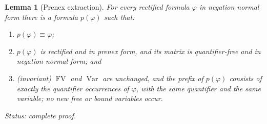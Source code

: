 \documentclass[11pt,oneside,openany]{book}
\theoremstyle{definition}
\theoremstyle{plain}
\newtheorem{lemma}[definition]{Lemma}
\theoremstyle{remark}
\newcommand{\FV}{\operatorname{FV}}
\begin{document}
\begin{lemma}[Prenex extraction]
\label{lem:prenex-extraction}
For every rectified formula \(\varphi\) in negation normal form there is
a formula \(p(\varphi)\) such that:
\begin{enumerate}
  \item \(p(\varphi)\equiv\varphi\);
  \item \(p(\varphi)\) is rectified and in prenex form, and its matrix is
        quantifier-free and in negation normal form; and
  \item \emph{(invariant)} \(\FV\) and \(\operatorname{Var}\) are
        unchanged, and the prefix of \(p(\varphi)\) consists of exactly
        the quantifier occurrences of \(\varphi\), with the same
        quantifier and the same variable; no new free or bound variables
        occur.
\end{enumerate}
\textit{Status: complete proof.}
\end{lemma}
\end{document}
